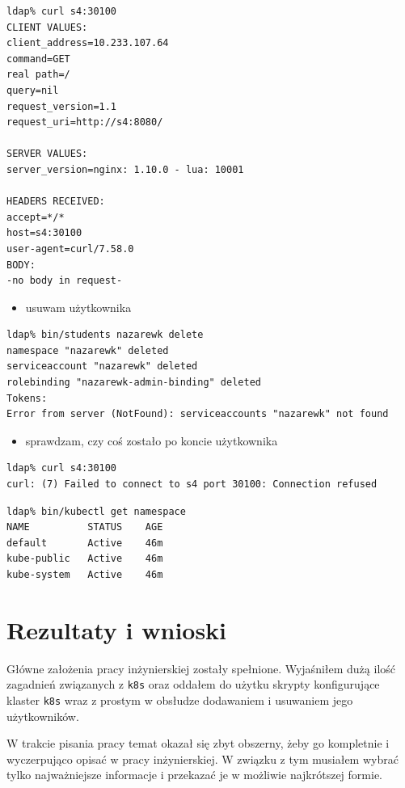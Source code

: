 \documentclass[a4paper,12pt,twoside,openany]{report}
\providecommand{\tightlist}{%
  \setlength{\itemsep}{0pt}\setlength{\parskip}{0pt}}
\newcommand{\passthrough}[1]{#1}
\begin{document}
\begin{lstlisting}
ldap% curl s4:30100
CLIENT VALUES:
client_address=10.233.107.64
command=GET
real path=/
query=nil
request_version=1.1
request_uri=http://s4:8080/

SERVER VALUES:
server_version=nginx: 1.10.0 - lua: 10001

HEADERS RECEIVED:
accept=*/*
host=s4:30100
user-agent=curl/7.58.0
BODY:
-no body in request-
\end{lstlisting}

\begin{itemize}
\tightlist
\item
  usuwam użytkownika
\end{itemize}

\begin{lstlisting}
ldap% bin/students nazarewk delete
namespace "nazarewk" deleted
serviceaccount "nazarewk" deleted
rolebinding "nazarewk-admin-binding" deleted
Tokens:
Error from server (NotFound): serviceaccounts "nazarewk" not found
\end{lstlisting}

\begin{itemize}
\tightlist
\item
  sprawdzam, czy coś zostało po koncie użytkownika
\end{itemize}

\begin{lstlisting}
ldap% curl s4:30100
curl: (7) Failed to connect to s4 port 30100: Connection refused
\end{lstlisting}

\begin{lstlisting}
ldap% bin/kubectl get namespace 
NAME          STATUS    AGE
default       Active    46m
kube-public   Active    46m
kube-system   Active    46m
\end{lstlisting}

\hypertarget{rezultaty-i-wnioski}{%
\chapter{Rezultaty i wnioski}\label{rezultaty-i-wnioski}}

Główne założenia pracy inżynierskiej zostały spełnione. Wyjaśniłem dużą
ilość zagadnień związanych z \passthrough{\lstinline!k8s!} oraz oddałem
do użytku skrypty konfigurujące klaster \passthrough{\lstinline!k8s!}
wraz z prostym w obsłudze dodawaniem i usuwaniem jego użytkowników.

W trakcie pisania pracy temat okazał się zbyt obszerny, żeby go
kompletnie i wyczerpująco opisać w pracy inżynierskiej. W związku z tym
musiałem wybrać tylko najważniejsze informacje i przekazać je w możliwie
najkrótszej formie.
\end{document}
